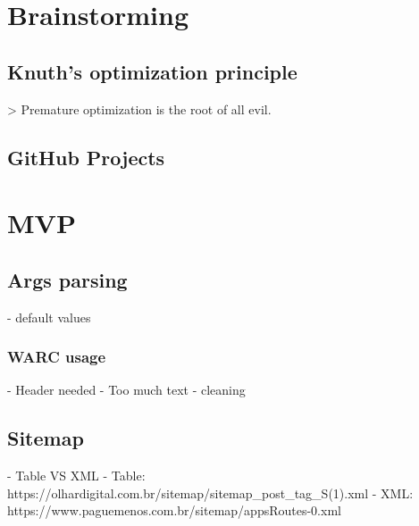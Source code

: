 
\section{Brainstorming}

\subsection{Knuth's optimization principle}

> Premature optimization is the root of all evil.

\subsection{GitHub Projects}

\section{MVP}

\subsection{Args parsing}

- default values

\subsubsection{WARC usage}

- Header needed
- Too much text
- cleaning

\subsection{Sitemap}

- Table VS XML
- Table: https://olhardigital.com.br/sitemap/sitemap_post_tag_S(1).xml
- XML: https://www.paguemenos.com.br/sitemap/appsRoutes-0.xml



